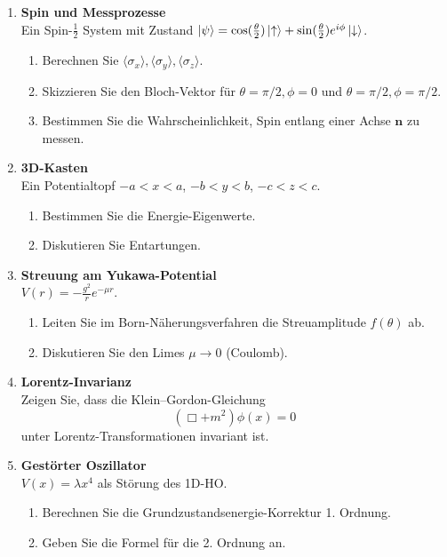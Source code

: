 \documentclass[11pt,a4paper]{article}
\begin{document}
\begin{enumerate}

\item \textbf{Spin und Messprozesse}\\
Ein Spin-$\tfrac12$ System mit Zustand $\ket{\psi}=\cos(\tfrac{\theta}{2})\ket{\uparrow}+\sin(\tfrac{\theta}{2})e^{i\phi}\ket{\downarrow}$.
\begin{enumerate}
  \item Berechnen Sie $\langle \sigma_x\rangle,\langle \sigma_y\rangle,\langle \sigma_z\rangle$.
  \item Skizzieren Sie den Bloch-Vektor für $\theta=\pi/2,\phi=0$ und $\theta=\pi/2,\phi=\pi/2$.
  \item Bestimmen Sie die Wahrscheinlichkeit, Spin entlang einer Achse $\mathbf n$ zu messen.
\end{enumerate}

\item \textbf{3D-Kasten}\\
Ein Potentialtopf $-a<x<a$, $-b<y<b$, $-c<z<c$.
\begin{enumerate}
  \item Bestimmen Sie die Energie-Eigenwerte.
  \item Diskutieren Sie Entartungen.
\end{enumerate}

\item \textbf{Streuung am Yukawa-Potential}\\
$V(r)=-\frac{g^2}{r}e^{-\mu r}$.
\begin{enumerate}
  \item Leiten Sie im Born-Näherungsverfahren die Streuamplitude $f(\theta)$ ab.
  \item Diskutieren Sie den Limes $\mu\to 0$ (Coulomb).
\end{enumerate}

\item \textbf{Lorentz-Invarianz}\\
Zeigen Sie, dass die Klein–Gordon-Gleichung
\[
(\Box+m^2)\phi(x)=0
\]
unter Lorentz-Transformationen invariant ist.

\item \textbf{Gestörter Oszillator}\\
$V(x)=\lambda x^4$ als Störung des 1D-HO.
\begin{enumerate}
  \item Berechnen Sie die Grundzustandsenergie-Korrektur 1. Ordnung.
  \item Geben Sie die Formel für die 2. Ordnung an.
\end{enumerate}


\end{enumerate}
\end{document}
